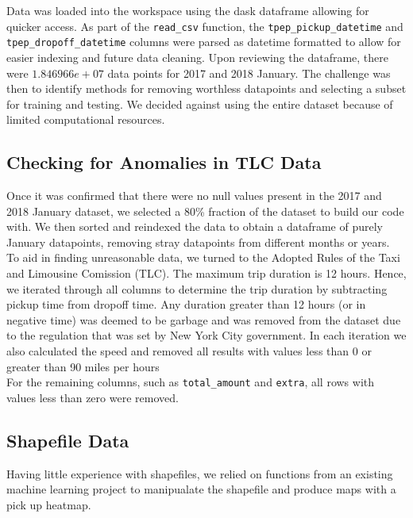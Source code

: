 \documentclass[journal, 12pt]{IEEEtran}
\newcommand{\cc}[1]{\texttt{#1}}
\begin{document}
\noindent Data was loaded into the workspace using the dask dataframe allowing for quicker access. As part of the \cc{read\_csv} function, the  \cc{tpep\_pickup\_datetime} and \cc{tpep\_dropoff\_datetime} columns were parsed as datetime formatted to allow for easier indexing and future data cleaning. Upon reviewing the dataframe, there were $1.846966e+07$ data points for 2017 and 2018 January. The challenge was then to identify methods for removing worthless datapoints and selecting a subset for training and testing. We decided against using the entire dataset because of limited computational resources. 

\subsection{Checking for Anomalies in TLC Data}

\noindent Once it was confirmed that there were no null values present in the 2017 and 2018 January dataset, we selected a 80\% fraction of the dataset to build our code with. We then sorted and reindexed the data to obtain a dataframe of purely January datapoints, removing stray datapoints from different months or years.\\

\noindent To aid in finding unreasonable data, we turned to the Adopted Rules of the Taxi and Limousine Comission (TLC). The maximum trip duration is 12 hours. Hence, we iterated through all columns to determine the trip duration by subtracting pickup time from dropoff time. Any duration greater than 12 hours (or in negative time) was deemed to be garbage and was removed from the dataset due to the regulation that was set by New York City government. In each iteration we also calculated the speed and removed all results with values less than 0 or greater than 90 miles per hours\\

\noindent For the remaining columns, such as \cc{total\_amount} and \cc{extra}, all rows with values less than zero were removed. 

\subsection{Shapefile Data}

\noindent Having little experience with shapefiles, we relied on functions from an existing machine learning project to manipualate the shapefile and produce maps with a pick up heatmap. 
\end{document}
